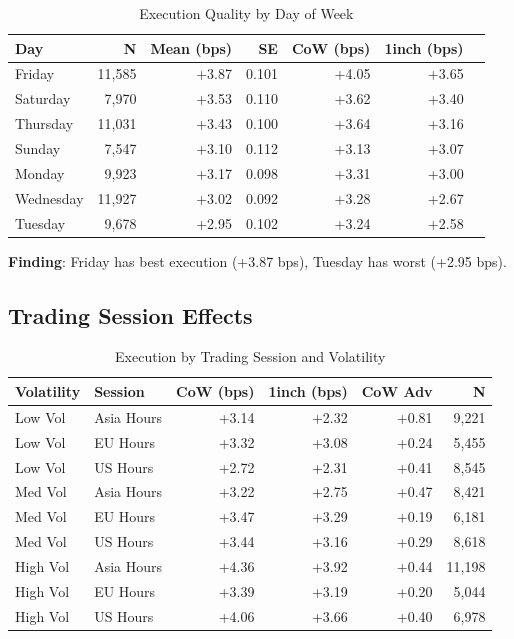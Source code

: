 \documentclass[11pt,a4paper]{article}
\begin{document}
\begin{table}[H]
\centering
\caption{Execution Quality by Day of Week}
\begin{tabular}{lrrrrrr}
\toprule
\textbf{Day} & \textbf{N} & \textbf{Mean (bps)} & \textbf{SE} & \textbf{CoW (bps)} & \textbf{1inch (bps)} \\
\midrule
Friday & 11,585 & +3.87 & 0.101 & +4.05 & +3.65 \\
Saturday & 7,970 & +3.53 & 0.110 & +3.62 & +3.40 \\
Thursday & 11,031 & +3.43 & 0.100 & +3.64 & +3.16 \\
Sunday & 7,547 & +3.10 & 0.112 & +3.13 & +3.07 \\
Monday & 9,923 & +3.17 & 0.098 & +3.31 & +3.00 \\
Wednesday & 11,927 & +3.02 & 0.092 & +3.28 & +2.67 \\
Tuesday & 9,678 & +2.95 & 0.102 & +3.24 & +2.58 \\
\bottomrule
\end{tabular}
\end{table}

\textbf{Finding}: Friday has best execution (+3.87 bps), Tuesday has worst (+2.95 bps).

\subsection{Trading Session Effects}

\begin{table}[H]
\centering
\caption{Execution by Trading Session and Volatility}
\begin{tabular}{llrrrr}
\toprule
\textbf{Volatility} & \textbf{Session} & \textbf{CoW (bps)} & \textbf{1inch (bps)} & \textbf{CoW Adv} & \textbf{N} \\
\midrule
Low Vol & Asia Hours & +3.14 & +2.32 & +0.81 & 9,221 \\
Low Vol & EU Hours & +3.32 & +3.08 & +0.24 & 5,455 \\
Low Vol & US Hours & +2.72 & +2.31 & +0.41 & 8,545 \\
Med Vol & Asia Hours & +3.22 & +2.75 & +0.47 & 8,421 \\
Med Vol & EU Hours & +3.47 & +3.29 & +0.19 & 6,181 \\
Med Vol & US Hours & +3.44 & +3.16 & +0.29 & 8,618 \\
High Vol & Asia Hours & +4.36 & +3.92 & +0.44 & 11,198 \\
High Vol & EU Hours & +3.39 & +3.19 & +0.20 & 5,044 \\
High Vol & US Hours & +4.06 & +3.66 & +0.40 & 6,978 \\
\bottomrule
\end{tabular}
\end{table}
\end{document}
